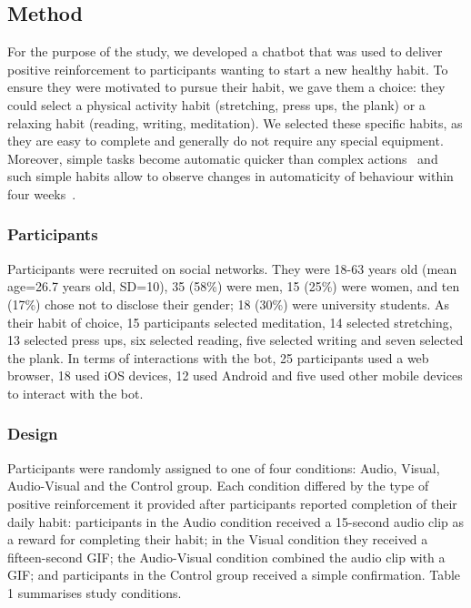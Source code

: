 \documentclass{scaffold/sigchi}
\begin{document}
\subsection{Method}
For the purpose of the study, we developed a chatbot that was used to deliver positive reinforcement to participants wanting to start a new healthy habit. To ensure they were motivated to pursue their habit, we gave them a choice: they could select a physical activity habit (stretching, press ups, the plank) or a relaxing habit (reading, writing, meditation). We selected these specific habits, as they are easy to complete and generally do not require any special equipment. Moreover, simple tasks become automatic quicker than complex actions~\cite{article_how_habits_formed_modelling_habit_formation} and such simple habits allow to observe changes in automaticity of behaviour within four weeks~\cite{article_beyond_self_tracking_designing_apps}.

\subsubsection{Participants}
Participants were recruited on social networks. They were 18-63 years old (mean age=26.7 years old, SD=10), 35 (58\%) were men, 15 (25\%) were women, and ten (17\%) chose not to disclose their gender; 18 (30\%) were university students. As their habit of choice, 15 participants selected meditation, 14 selected stretching, 13 selected press ups, six selected reading, five selected writing and seven selected the plank. In terms of interactions with the bot, 25 participants used a web browser, 18 used iOS devices, 12 used Android and five used other mobile devices to interact with the bot. 

\subsubsection{Design}
Participants were randomly assigned to one of four conditions: Audio, Visual, Audio-Visual and the Control group. Each condition differed by the type of positive reinforcement it provided after participants reported completion of their daily habit: participants in the Audio condition received a 15-second audio clip as a reward for completing their habit; in the Visual condition they received a fifteen-second GIF; the Audio-Visual condition combined the audio clip with a GIF; and participants in the Control group received a simple confirmation. Table 1 summarises study conditions. 
\end{document}
